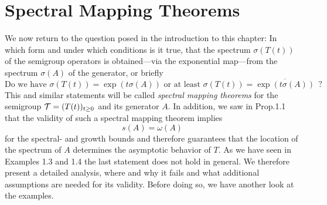 \section{Spectral Mapping Theorems}\label{sec:a3-6}
We now return to the question posed in the introduction to this chapter: In which form and under which conditions is it true, that the spectrum $\sigma(T(t))$ of the semigroup operators is obtained---via the exponential map---from the spectrum $\sigma(A)$ of the generator, or briefly
\[
\text{Do we have } \sigma(T(t)) = \exp(t\sigma(A)) \text{ or at least }
 \sigma(T(t)) = \overline{\exp(t\sigma(A))} ~~?
\]
This and similar statements will be called \emph{spectral mapping theorems} for the semigroup $\mathcal{T} = (T(t))_{t \geq 0}$ and its generator $A$.
In addition, we saw in Prop.1.1 that the validity of such a spectral mapping theorem implies
\[
s(A) = \omega(A)
\]
for the spectral- and growth bounds and therefore guarantees that the location of the spectrum of $A$ determines the asymptotic behavior of $T$.
As we have seen in Examples 1.3 and 1.4 the last statement does not hold in general.
We therefore present a detailed analysis, where and why it fails and what additional assumptions are needed for its validity.
Before doing so, we have another look at the examples.
